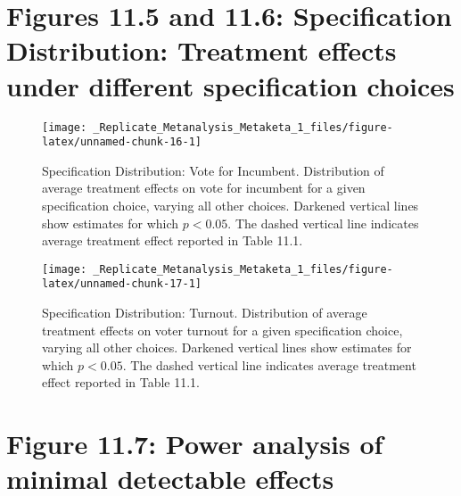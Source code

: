 \documentclass[]{article}
\begin{document}
\clearpage

\section{Figures 11.5 and 11.6: Specification Distribution: Treatment
effects under different specification
choices}\label{figures-11.5-and-11.6-specification-distribution-treatment-effects-under-different-specification-choices}

\begin{figure}

{\centering \texttt{[image: \_Replicate\_Metanalysis\_Metaketa\_1\_files/figure-latex/unnamed-chunk-16-1]} 

}

\caption{Specification Distribution: Vote for Incumbent. Distribution of average treatment effects on vote for incumbent for a given specification choice, varying all other choices. Darkened vertical lines show estimates for which $p<0.05$. The dashed vertical line indicates average treatment effect reported in Table 11.1.}\label{fig:unnamed-chunk-16}
\end{figure}

\begin{figure}

{\centering \texttt{[image: \_Replicate\_Metanalysis\_Metaketa\_1\_files/figure-latex/unnamed-chunk-17-1]} 

}

\caption{Specification Distribution: Turnout. Distribution of average treatment effects on voter turnout for a given specification choice, varying all other choices. Darkened vertical lines show estimates for which $p<0.05$. The dashed vertical line indicates average treatment effect reported in Table 11.1.}\label{fig:unnamed-chunk-17}
\end{figure}

\section{Figure 11.7: Power analysis of minimal detectable
effects}\label{figure-11.7-power-analysis-of-minimal-detectable-effects}
\end{document}
